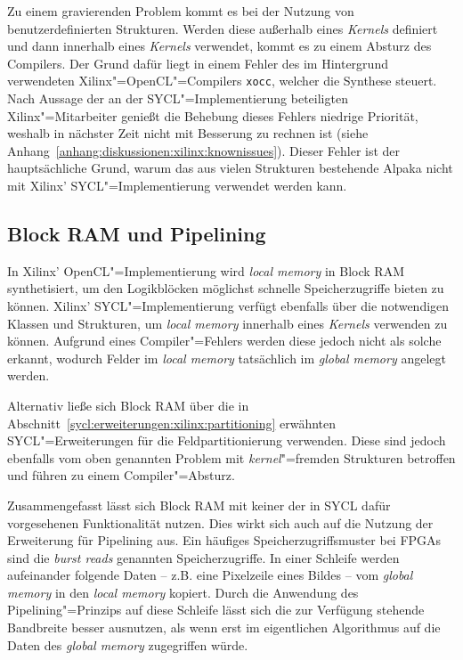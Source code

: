Zu einem gravierenden Problem kommt es bei der Nutzung von benutzerdefinierten
Strukturen. Werden diese außerhalb eines \textit{Kernels} definiert und dann
innerhalb eines \textit{Kernels} verwendet, kommt es zu einem Absturz des
Compilers. Der Grund dafür liegt in einem Fehler des im Hintergrund verwendeten
Xilinx"=OpenCL"=Compilers \texttt{xocc}, welcher die Synthese steuert. Nach
Aussage der an der SYCL"=Implementierung beteiligten Xilinx"=Mitarbeiter genießt
die Behebung dieses Fehlers niedrige Priorität, weshalb in nächster Zeit nicht
mit Besserung zu rechnen ist (siehe
Anhang~\ref{anhang:diskussionen:xilinx:knownissues}). Dieser Fehler ist der
hauptsächliche Grund, warum das aus vielen Strukturen bestehende Alpaka nicht
mit Xilinx' SYCL"=Implementierung verwendet werden kann.

\subsection{Block RAM und Pipelining}

In Xilinx' OpenCL"=Implementierung wird \textit{local memory} in Block RAM
synthetisiert, um den Logikblöcken möglichst schnelle Speicherzugriffe bieten zu
können. Xilinx' SYCL"=Implementierung verfügt ebenfalls über die notwendigen
Klassen und Strukturen, um \textit{local memory} innerhalb eines
\textit{Kernels} verwenden zu können. Aufgrund eines Compiler"=Fehlers werden
diese jedoch nicht als solche erkannt, wodurch Felder im \textit{local memory}
tatsächlich im \textit{global memory} angelegt werden.

Alternativ ließe sich Block RAM über die in
Abschnitt~\ref{sycl:erweiterungen:xilinx:partitioning} erwähnten
SYCL"=Erweiterungen für die Feldpartitionierung verwenden. Diese sind jedoch
ebenfalls vom oben genannten Problem mit \textit{kernel}"=fremden Strukturen
betroffen und führen zu einem Compiler"=Absturz.

Zusammengefasst lässt sich Block RAM mit keiner der in SYCL dafür vorgesehenen
Funktionalität nutzen. Dies wirkt sich auch auf die Nutzung der Erweiterung
für Pipelining aus. Ein häufiges Speicherzugriffsmuster bei FPGAs sind die
\textit{burst reads} genannten Speicherzugriffe. In einer Schleife werden
aufeinander folgende Daten -- z.B. eine Pixelzeile eines Bildes -- vom
\textit{global memory} in den \textit{local memory} kopiert. Durch die Anwendung
des Pipelining"=Prinzips auf diese Schleife lässt sich die zur Verfügung
stehende Bandbreite besser ausnutzen, als wenn erst im eigentlichen Algorithmus
auf die Daten des \textit{global memory} zugegriffen würde.

